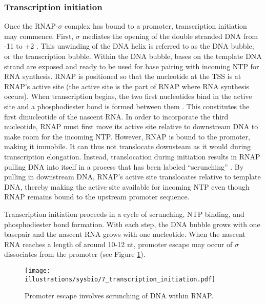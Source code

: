 \subsubsection{Transcription initiation}
Once the RNAP-$\sigma$ complex has bound to a promoter, transcription
initiation may commence. First, $\sigma$ mediates the opening of the double
stranded DNA from -11 to +2 \cite{borukhov_rna_2008}. This unwinding of the DNA
helix is referred to as the DNA bubble, or the transcription bubble. Within the
DNA bubble, bases on the template DNA strand are exposed and ready to be used
for base pairing with incoming NTP for RNA synthesis. RNAP is positioned so
that the nucleotide at the TSS is at RNAP's active site (the active site is the
part of RNAP where RNA synthesis occurs). When transcription begins, the two
first nucleotides bind in the active site and a phosphodiester bond is formed
between them \cite{mcclure_steady_1978}. This constitutes the first
dinucleotide of the nascent RNA. In order to incorporate the third nucleotide,
RNAP must first move its active site relative to downstream DNA to make room
for the incoming NTP. However, RNAP is bound to the promoter, making it
immobile. It can thus not translocate downsteam as it would during
transcription elongation. Instead, translocation during initiation results in
RNAP pulling DNA into itself in a process that has been labeled ``scrunching''
\cite{kapanidis_initial_2006, revyakin_abortive_2006}. By pulling in downstream
DNA, RNAP's active site translocates relative to template DNA, thereby making
the active site available for incoming NTP even though RNAP remains bound to
the upstream promoter sequence.

Transcription initiation proceeds in a cycle of scrunching, NTP binding, and
phosphodiester bond formation. With each step, the DNA bubble grows with one
basepair and the nascent RNA grows with one nucleotide. When the nascent RNA
reaches a length of around 10-12 nt, promoter escape may occur of $\sigma$
dissociates from the promoter \cite{lilian_m_promoter_2002} (see
Figure \ref{fig:simple_escape}).

\begin{figure}[htb]
	\begin{center}
		\texttt{[image: illustrations/sysbio/7\_transcription\_initiation.pdf]}
	\end{center}
	\caption{Promoter escape involves scrunching of DNA within RNAP.}
	\label{fig:simple_escape}
\end{figure}

